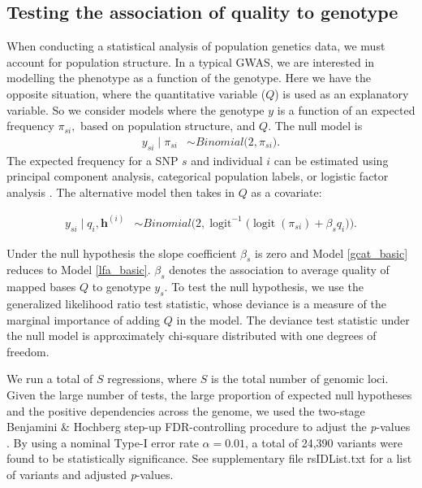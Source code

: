 \documentclass[9pt,lineno]{elife}
\newcommand{\logit}{\operatorname{logit}}
\begin{document}
\subsection{Testing the association of quality to genotype}
When conducting a statistical analysis of population genetics data, we must account for population structure. In a typical GWAS, we are interested in modelling the phenotype as a function of the genotype. 
Here we have the opposite situation, where the quantitative variable ($Q$) is used as an explanatory variable. 
So we consider models where the genotype $y$ is a function of an expected frequency $\pi_{si},$ based on population structure, and $Q$. 
The null model is 
\begin{align} \label{lfa_basic}
y_{si} \mid \pi_{si}  &\sim Binomial\big( 2, \pi_{si} \big).
\end{align} 
The expected frequency for a SNP $s$ and individual $i$ can be estimated using principal component analysis, categorical population labels, or logistic factor analysis \citep{song2015testing}. The alternative model then takes in $Q$ as a covariate: 

\begin{align}\label{gcat_basic}
 y_{si} \mid q_i, \boldsymbol{h}^{(i)} &\sim Binomial\bigg( 2, \logit^{-1}\Big(\logit(\pi_{si}) + \beta_s q_i\Big) \bigg).
\end{align} 

Under the null hypothesis the slope coefficient $\beta_s$ is zero and Model \eqref{gcat_basic} reduces to Model \eqref{lfa_basic}. 
$\beta_s$ denotes the association to average quality of mapped bases $Q$ to genotype $y_{s}$. 
To test the null hypothesis, we use the generalized likelihood ratio test statistic, whose deviance is a measure of the marginal importance of adding $Q$ in the model. 
The deviance test statistic under the null model is approximately chi-square distributed with one degrees of freedom.

We run a total of $S$ regressions, where $S$ is the total number of genomic loci. Given the large number of tests, the large proportion of expected null hypotheses and the positive dependencies across the genome, we used the two-stage Benjamini \& Hochberg step-up FDR-controlling procedure to adjust the \textit{p}-values \citep{Benjamini2006}.
By using a nominal Type-I error rate $\alpha = 0.01$, a total of 24,390 variants were found to be statistically significance. 
See supplementary file rsIDList.txt for a list of variants and adjusted \textit{p}-values.
\end{document}
